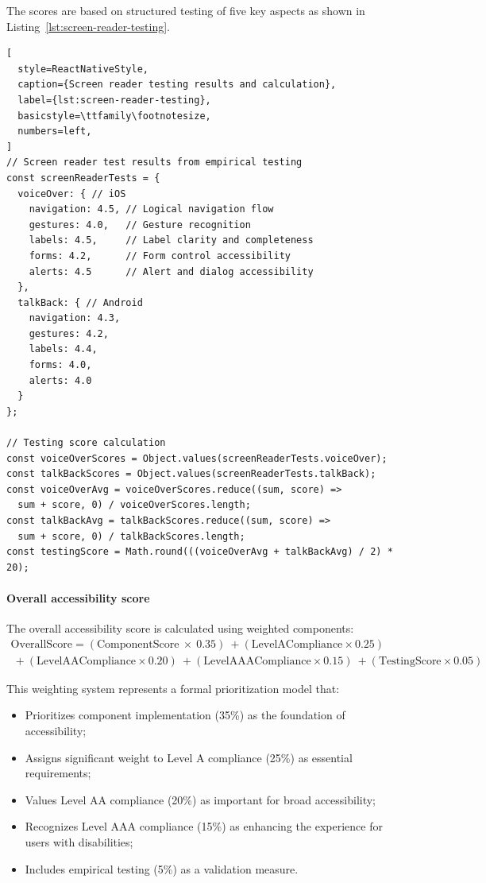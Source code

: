 The scores are based on structured testing of five key aspects as shown in Listing~\ref{lst:screen-reader-testing}.

\begin{lstlisting}[
  style=ReactNativeStyle,
  caption={Screen reader testing results and calculation},
  label={lst:screen-reader-testing},
  basicstyle=\ttfamily\footnotesize,
  numbers=left,
]
// Screen reader test results from empirical testing
const screenReaderTests = {
  voiceOver: { // iOS
    navigation: 4.5, // Logical navigation flow
    gestures: 4.0,   // Gesture recognition
    labels: 4.5,     // Label clarity and completeness
    forms: 4.2,      // Form control accessibility
    alerts: 4.5      // Alert and dialog accessibility
  },
  talkBack: { // Android
    navigation: 4.3,
    gestures: 4.2,
    labels: 4.4,
    forms: 4.0,
    alerts: 4.0
  }
};

// Testing score calculation
const voiceOverScores = Object.values(screenReaderTests.voiceOver);
const talkBackScores = Object.values(screenReaderTests.talkBack);
const voiceOverAvg = voiceOverScores.reduce((sum, score) => 
  sum + score, 0) / voiceOverScores.length;
const talkBackAvg = talkBackScores.reduce((sum, score) => 
  sum + score, 0) / talkBackScores.length;
const testingScore = Math.round(((voiceOverAvg + talkBackAvg) / 2) * 20);
\end{lstlisting}

\FloatBarrier

\paragraph{Overall accessibility score}

The overall accessibility score is calculated using weighted components:
\begin{equation}
\begin{split}
\text{OverallScore}
= (\text{ComponentScore} \ \times \ 0.35)  
\ + (\text{LevelACompliance} \times 0.25) \\
\ + (\text{LevelAACompliance} \times 0.20)
\ + (\text{LevelAAACompliance} \times 0.15)
\ + (\text{TestingScore} \times 0.05)
\end{split}
\end{equation}

This weighting system represents a formal prioritization model that:
\begin{itemize}
\item Prioritizes component implementation (35\%) as the foundation of accessibility;
\item Assigns significant weight to Level A compliance (25\%) as essential requirements;
\item Values Level AA compliance (20\%) as important for broad accessibility;
\item Recognizes Level AAA compliance (15\%) as enhancing the experience for users with disabilities;
\item Includes empirical testing (5\%) as a validation measure.
\end{itemize}

